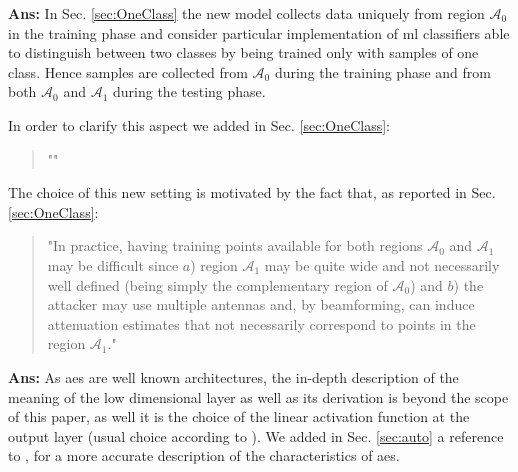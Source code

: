 \documentclass[draftcls,onecolumn,12pt]{IEEEtran}
\newcounter{revc}
\newcommand{\revp}[1]{\zref[revcontent]{#1}}
\newcommand{\A}[1]{\mathcal{A}_#1}
\begin{document}
{\bf Ans:} In Sec. \ref{sec:OneClass} the new model collects data uniquely from region $\mathcal{A}_0$ in the training phase and consider particular implementation of \ac{ml} classifiers able to distinguish between two classes by being trained only with samples of one class. Hence samples are collected from $\mathcal{A}_0$ during the training phase and from both $\mathcal{A}_0$ and $\mathcal{A}_1$ during the testing phase. 

In order to clarify this aspect we added in Sec. \ref{sec:OneClass}:
\begin{quote}
"\revp{oneClass}"
\end{quote}

The choice of this new setting is motivated by the fact that, as reported in Sec. \ref{sec:OneClass}:
\begin{quote}
"In practice, having training points available for both regions $\mathcal A_0$ and ${\mathcal A}_1$ may be difficult since $a$) region $\A{1}$ may be quite wide and not necessarily well defined (being simply the complementary region of $\mathcal A_0$) and $b$) the attacker may use multiple antennas and, by beamforming, can induce attenuation estimates that not necessarily correspond to points in the region $\A{1}$."
\end{quote}


\vspace{5mm} %
\begin{framed}
\end{framed}

{\bf Ans:} As \acp{ae} are well known architectures, the in-depth description of the meaning of the low dimensional layer as well as its derivation is beyond the scope of this paper, as well it is the choice of the linear activation function at the output layer (usual choice according to \cite[Chapter 14]{Goodfellow}). We added in Sec. \ref{sec:auto} a reference to \cite[Chapter 14]{Goodfellow}, for a more accurate description of the characteristics of \acp{ae}.

\vspace{5mm} %
\begin{framed}
\end{framed}
\end{document}
